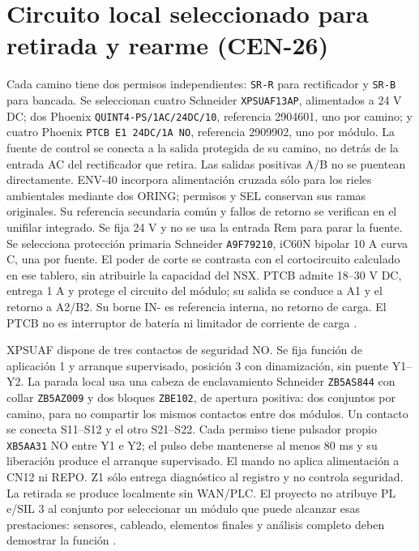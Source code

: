 \section{Circuito local seleccionado para retirada y rearme (CEN-26)}
\label{sec:sd4-circuito-cen26}

Cada camino tiene dos permisos independientes: \texttt{SR-R} para rectificador y \texttt{SR-B} para bancada. Se seleccionan cuatro Schneider \texttt{XPSUAF13AP}, alimentados a 24 V DC; dos Phoenix \texttt{QUINT4-PS/1AC/24DC/10}, referencia 2904601, uno por camino; y cuatro Phoenix \texttt{PTCB E1 24DC/1A NO}, referencia 2909902, uno por módulo. La fuente de control se conecta a la salida protegida de su camino, no detrás de la entrada AC del rectificador que retira. Las salidas positivas A/B no se puentean directamente. ENV-40 incorpora alimentación cruzada sólo para los rieles ambientales mediante dos ORING; permisos y SEL conservan sus ramas originales. Su referencia secundaria común y fallos de retorno se verifican en el unifilar integrado. Se fija 24 V y no se usa la entrada Rem para parar la fuente. Se selecciona protección primaria Schneider \texttt{A9F79210}, iC60N bipolar 10 A curva C, una por fuente. El poder de corte se contrasta con el cortocircuito calculado en ese tablero, sin atribuirle la capacidad del NSX. PTCB admite 18--30 V DC, entrega 1 A y protege el circuito del módulo; su salida se conduce a A1 y el retorno a A2/B2. Su borne IN- es referencia interna, no retorno de carga. El PTCB no es interruptor de batería ni limitador de corriente de carga \parencites[pp.~21--23, 41--42 y 45]{lote26-xpsmanual}[pp.~3--5]{p6-puestos-quint}{lote26-ptcb}{lote26-mcb10}.

XPSUAF dispone de tres contactos de seguridad NO. Se fija función de aplicación 1 y arranque supervisado, posición 3 con dinamización, sin puente Y1--Y2. La parada local usa una cabeza de enclavamiento Schneider \texttt{ZB5AS844} con collar \texttt{ZB5AZ009} y dos bloques \texttt{ZBE102}, de apertura positiva: dos conjuntos por camino, para no compartir los mismos contactos entre dos módulos. Un contacto se conecta S11--S12 y el otro S21--S22. Cada permiso tiene pulsador propio \texttt{XB5AA31} NO entre Y1 e Y2; el pulso debe mantenerse al menos 80 ms y su liberación produce el arranque supervisado. El mando no aplica alimentación a CN12 ni REPO. Z1 sólo entrega diagnóstico al registro y no controla seguridad. La retirada se produce localmente sin WAN/PLC. El proyecto no atribuye PL e/SIL 3 al conjunto por seleccionar un módulo que puede alcanzar esas prestaciones: sensores, cableado, elementos finales y análisis completo deben demostrar la función \parencites[pp.~41--45 y 51--54]{lote26-xpsmanual}{lote26-estop}{lote26-collar}{lote26-contactonc}{lote26-reset}.

